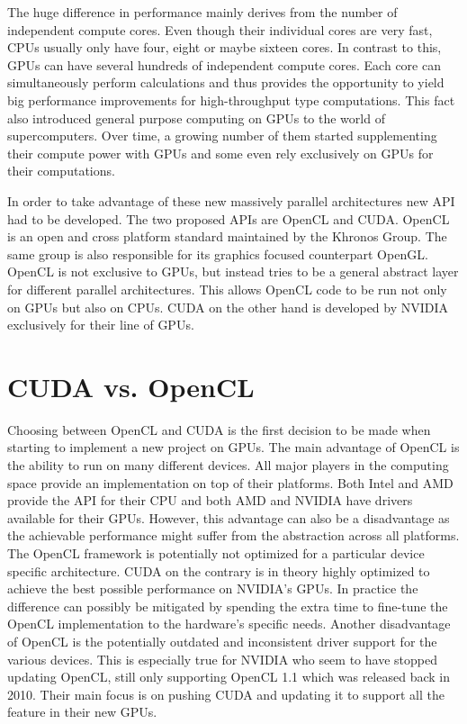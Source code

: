 \documentclass[a4paper,11pt]{kth-mag}
\begin{document}
The huge difference in performance mainly derives from the number of independent compute cores. Even though their individual cores are very fast, CPUs usually only have four, eight or maybe sixteen cores. In contrast to this, GPUs can have several hundreds of independent compute cores. Each core can simultaneously perform calculations and thus provides the opportunity to yield big performance improvements for high-throughput type computations. This fact also introduced general purpose computing on GPUs to the world of supercomputers. Over time, a growing number of them started supplementing their compute power with GPUs and some even rely exclusively on GPUs for their computations.

In order to take advantage of these new massively parallel architectures new API had to be developed. The two proposed APIs are OpenCL and CUDA. OpenCL is an open and cross platform standard maintained by the Khronos Group. The same group is also responsible for its graphics focused counterpart OpenGL. OpenCL is not exclusive to GPUs, but instead tries to be a general abstract layer for different parallel architectures. This allows OpenCL code to be run not only on GPUs but also on CPUs. CUDA on the other hand is developed by NVIDIA exclusively for their line of GPUs.

\section{CUDA vs. OpenCL}

Choosing between OpenCL and CUDA is the first decision to be made when starting to implement a new project on GPUs. The main advantage of OpenCL is the ability to run on many different devices. All major players in the computing space provide an implementation on top of their platforms. Both Intel and AMD provide the API for their CPU and both AMD and NVIDIA have drivers available for their GPUs. However, this advantage can also be a disadvantage as the achievable performance might suffer from the abstraction across all platforms. The OpenCL framework is potentially not optimized for a particular device specific architecture. CUDA on the contrary is in theory highly optimized to achieve the best possible performance on NVIDIA's GPUs. In practice the difference can possibly be mitigated by spending the extra time to fine-tune the OpenCL implementation to the hardware's specific needs. Another disadvantage of OpenCL is the potentially outdated and inconsistent driver support for the various devices. This is especially true for NVIDIA who seem to have stopped updating OpenCL, still only supporting OpenCL 1.1 which was released back in 2010. Their main focus is on pushing CUDA and updating it to support all the feature in their new GPUs.
\end{document}
